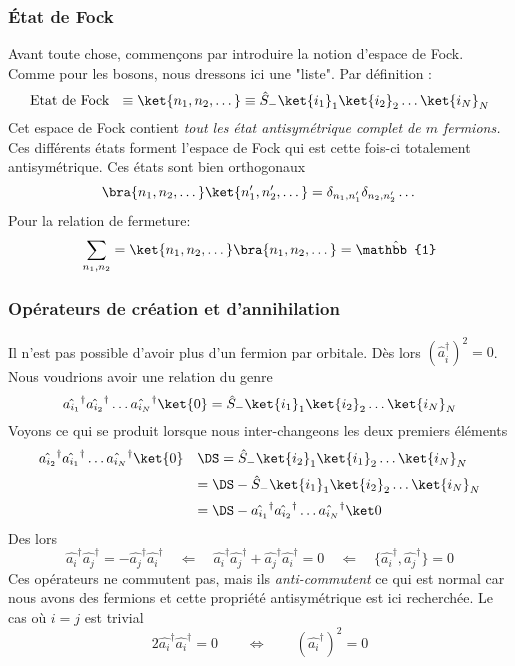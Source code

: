 \subsubsection{État de Fock}
Avant toute chose, commençons par introduire la notion d'espace de Fock. Comme pour les bosons, nous 
dressons ici une "liste". Par définition :
\begin{equation}
\text{Etat de Fock }\ \equiv \ket{n_1,n_2,\dots} \equiv \hat{S}_-\ket{i_1}_1\ket{i_2}_2\dots\ket{i_N}_N 
\end{equation}
Cet espace de Fock contient \textit{tout les état antisymétrique complet de $m$ fermions.} Ces différents 
états forment l'espace de Fock qui est cette fois-ci totalement antisymétrique. Ces états sont bien 
orthogonaux
\begin{equation}
\bra{n_1,n_2,\dots}\ket{n_1',n_2',\dots} = \delta_{n_1,n_1'}\delta_{n_2,n_2'}\dots
\end{equation}
Pour la relation de fermeture:
\begin{equation}
\sum_{n_1,n_2} = \ket{n_1,n_2,\dots}\bra{n_1,n_2,\dots} =\hat{\mathbb{1}}
\end{equation}

\subsubsection{Opérateurs de création et d'annihilation}
Il n'est pas possible d'avoir plus d'un fermion par orbitale. Dès lors $(\hat{a}_i^\dagger)^2=0$. Nous 
voudrions avoir une relation du genre
\begin{equation}
\hat{a_{i_1}}^\dagger\hat{a_{i_2}}^\dagger\dots\hat{a_{i_N}}^\dagger\ket{0} = \hat{S}_-\ket{i_1}_1
\ket{i_2}_2\dots\ket{i_N}_N
\end{equation}
Voyons ce qui se produit lorsque nous inter-changeons les deux premiers éléments
\begin{equation}
\begin{array}{ll}
\hat{a_{i_2}}^\dagger\hat{a_{i_1}}^\dagger\dots\hat{a_{i_N}}^\dagger\ket{0} &\DS= \hat{S}_-\ket{i_2}_1
\ket{i_1}_2\dots\ket{i_N}_N\vspace{2mm}\\
&=\DS-\hat{S}_-\ket{i_1}_1\ket{i_2}_2\dots\ket{i_N}_N\vspace{2mm}\\
&=\DS-\hat{a_{i_1}}^\dagger\hat{a_{i_2}}^\dagger\dots\hat{a_{i_N}}^\dagger\ket0
\end{array}
\end{equation}
Des lors
\begin{equation}
\hat{a_i}^\dagger\hat{a_j}^\dagger = -\hat{a_j}^\dagger\hat{a_i}^\dagger\quad\Leftarrow\quad
\hat{a_i}^\dagger\hat{a_j}^\dagger +\hat{a_j}^\dagger\hat{a_i}^\dagger= 0\quad\Leftarrow\quad 
\{ \hat{a_i}^\dagger, \hat{a_j}^\dagger\}=0
\end{equation}
Ces opérateurs ne commutent pas, mais ils \textit{anti-commutent} ce qui est normal car nous avons 
des fermions et cette propriété antisymétrique est ici recherchée. Le cas où $i=j$ est trivial
\begin{equation}
2\hat{a_i}^\dagger\hat{a_i}^\dagger = 0\qquad\Leftrightarrow\qquad (\hat{a_i}^\dagger)^2=0
\end{equation}

